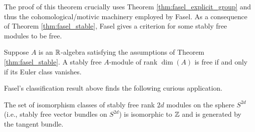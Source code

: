 The proof of this theorem crucially uses Theorem \ref{thm:fasel_explicit_group} and thus the cohomological/motivic machinery employed by Fasel. As a consequence of Theorem \ref{thm:fasel_stable}, Fasel gives a criterion for some stably free modules to be free. 

\begin{theorem}\cite[Theorem 5.10]{Fasel-unim}
    Suppose $A$ is an $\mathbb{R}$-algebra satisfying the assumptions of Theorem \ref{thm:fasel_stable}. A stably free $A$-module of rank $\dim(A)$ is free if and only if its Euler class vanishes.
\end{theorem}

Fasel's classification result above finds the following curious application. 

\begin{corollary}\cite[Corollary 5.12]{Fasel-unim}
    The set of isomorphism classes of stably free rank $2d$ modules on the sphere $S^{2d}$ (i.e., stably free vector bundles on $S^{2d}$) is isomorphic to $\mathbb{Z}$ and is generated by the tangent bundle. 
\end{corollary}
